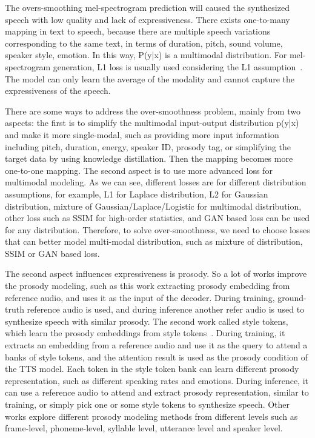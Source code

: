 \documentclass{article}
\begin{document}
The overs-smoothing mel-spectrogram prediction will caused the synthesized speech with low quality and lack of expressiveness. There exists one-to-many mapping in text to speech, because there are multiple speech variations corresponding to the same text, in terms of duration, pitch, sound volume, speaker style, emotion. In this way, P(y|x) is a multimodal distribution. For mel-spectrogram generation, L1 loss is usually used considering the L1 assumption~\cite{gazor2003speech,usman2018probabilistic}. The model can only learn the average of the modality and cannot capture the expressiveness of the speech. 

There are some ways to address the over-smoothness problem, mainly from two aspects: the first is to simplify the multimodal input-output distribution p(y|x) and make it more single-modal, such as providing more input information including pitch, duration, energy, speaker ID, prosody tag,  or simplifying the target data by using knowledge distillation. Then the mapping becomes more one-to-one mapping. The second aspect is to use more advanced loss for multimodal modeling. As we can see, different losses are for different distribution assumptions, for example, L1 for Laplace distribution, L2 for Gaussian distribution, mixture of Gaussian/Laplace/Logistic for multimodal distribution, other loss such as SSIM for high-order statistics, and GAN based loss can be used for any distribution. Therefore, to solve over-smoothness, we need to choose losses that can better model multi-modal distribution, such as mixture of distribution, SSIM or GAN based loss. 


The second aspect influences expressiveness is prosody. So a lot of works improve the prosody modeling, such as this work extracting prosody embedding from reference audio, and uses it as the input of the decoder. During training, ground-truth reference audio is used, and during inference another refer audio is used to synthesize speech with similar prosody. The second work called style tokens, which learn the prosody embeddings from style tokens~\cite{wang2018style,skerry2018towards}. During training, it extracts an embedding from a reference audio and use it as the query to attend a banks of style tokens, and the attention result is used as the prosody condition of the TTS model. Each token in the style token bank can learn different prosody representation, such as different speaking rates and emotions. During inference, it can use a reference audio to attend and extract prosody representation, similar to training, or simply pick one or some style tokens to synthesize speech.  Other works explore different prosody modeling methods from different levels such as frame-level, phoneme-level, syllable level, utterance level and speaker level. 
\end{document}
